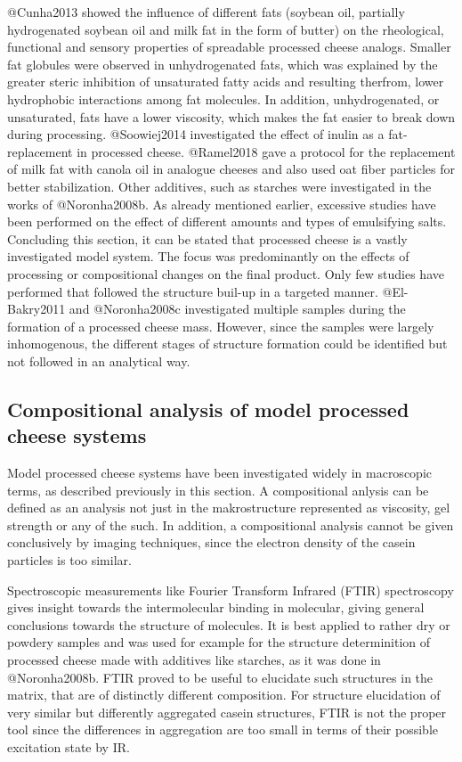 \documentclass[
]{article}
\begin{document}
@Cunha2013 showed the influence of different fats (soybean oil,
partially hydrogenated soybean oil and milk fat in the form of butter)
on the rheological, functional and sensory properties of spreadable
processed cheese analogs. Smaller fat globules were observed in
unhydrogenated fats, which was explained by the greater steric
inhibition of unsaturated fatty acids and resulting therfrom, lower
hydrophobic interactions among fat molecules. In addition,
unhydrogenated, or unsaturated, fats have a lower viscosity, which makes
the fat easier to break down during processing. @Soowiej2014
investigated the effect of inulin as a fat-replacement in processed
cheese. @Ramel2018 gave a protocol for the replacement of milk fat with
canola oil in analogue cheeses and also used oat fiber particles for
better stabilization. Other additives, such as starches were
investigated in the works of @Noronha2008b. As already mentioned
earlier, excessive studies have been performed on the effect of
different amounts and types of emulsifying salts. Concluding this
section, it can be stated that processed cheese is a vastly investigated
model system. The focus was predominantly on the effects of processing
or compositional changes on the final product. Only few studies have
performed that followed the structure buil-up in a targeted manner.
@El-Bakry2011 and @Noronha2008c investigated multiple samples during the
formation of a processed cheese mass. However, since the samples were
largely inhomogenous, the different stages of structure formation could
be identified but not followed in an analytical way.

\subsection{Compositional analysis of model processed cheese systems}

Model processed cheese systems have been investigated widely in
macroscopic terms, as described previously in this section. A
compositional anlysis can be defined as an analysis not just in the
makrostructure represented as viscosity, gel strength or any of the
such. In addition, a compositional analysis cannot be given conclusively
by imaging techniques, since the electron density of the casein
particles is too similar.

Spectroscopic measurements like Fourier Transform Infrared (FTIR)
spectroscopy gives insight towards the intermolecular binding in
molecular, giving general conclusions towards the structure of
molecules. It is best applied to rather dry or powdery samples and was
used for example for the structure determinition of processed cheese
made with additives like starches, as it was done in @Noronha2008b. FTIR
proved to be useful to elucidate such structures in the matrix, that are
of distinctly different composition. For structure elucidation of very
similar but differently aggregated casein structures, FTIR is not the
proper tool since the differences in aggregation are too small in terms
of their possible excitation state by IR.
\end{document}
